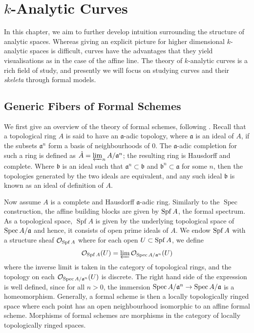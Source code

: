 \chapter{$k$-Analytic Curves}

In this chapter, we aim to further develop intuition surrounding the structure of analytic spaces.
Whereas giving an explicit picture for higher dimensional $k$-analytic spaces is difficult, curves have the advantages that they yield visualisations as in the case of the affine line.
The theory of $k$-analytic curves is a rich field of study, and presently we will focus on studying curves and their \textit{skeleta} through formal models.

\section{Generic Fibers of Formal Schemes}

We first give an overview of the theory of formal schemes, following \parencite[Chapter~7]{boschformal}.
Recall that a topological ring $A$ is said to have an $\mathfrak{a}$-adic topology, where $\mathfrak{a}$ is an ideal of $A$, if the subsets $\mathfrak{a}^n$ form a basis of neighbourhoods of $0$.
The $\mathfrak{a}$-adic completion for such a ring is defined as $\hat{A} = \varprojlim_{n} A/\mathfrak{a}^n$; the resulting ring is Hausdorff and complete.
Where $\mathfrak{b}$ is an ideal such that $\mathfrak{a}^n \subset \mathfrak{b}$ and $\mathfrak{b}^n \subset \mathfrak{a}$ for some $n$, then the topologies generated by the two ideals are equivalent, and any such ideal $\mathfrak{b}$ is known as an ideal of definition of $A$.

Now assume $A$ is a complete and Hausdorff $\mathfrak{a}$-adic ring.
Similarly to the $\operatorname{Spec}$ construction, the affine building blocks are given by $\operatorname{Spf} A$, the formal spectrum. As a topological space, $\operatorname{Spf} A$ is given by
the underlying topological space of $\operatorname{Spec} A/\mathfrak{a}$ and hence, it consists of open prime ideals of $A$.
We endow $\operatorname{Spf} A$ with a structure sheaf $\mathcal{O}_{\operatorname{Spf} A}$ where for each open $U \subset \operatorname{Spf} A$, we define 
\[
    \mathcal{O}_{\operatorname{Spf} A}(U) = \varprojlim \mathcal{O}_{\operatorname{Spec}{A/\mathfrak{a}^n}}(U)
\]
where the inverse limit is taken in the category of topological rings, and the topology on each $\mathcal{O}_{\operatorname{Spec}{A/\mathfrak{a}^n}}(U)$ is discrete.
The right hand side of the expression is well defined, since for all $n > 0$, the immersion $\operatorname{Spec} A/\mathfrak{a}^n \to \operatorname{Spec}{A/\mathfrak{a}}$ is a homeomorphism.
Generally, a formal scheme is then a locally topologically ringed space where each point has an open neighbourhood isomorphic to an affine formal scheme.
Morphisms of formal schemes are morphisms in the category of locally topologically ringed spaces.

